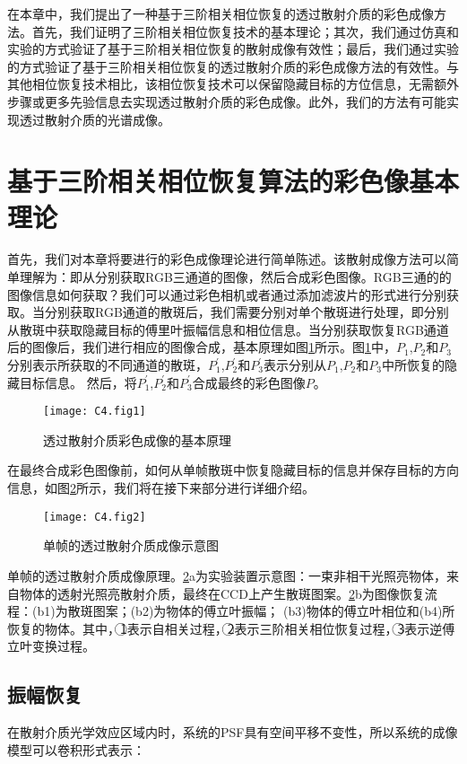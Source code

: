 在本章中，我们提出了一种基于三阶相关相位恢复的透过散射介质的彩色成像方法。首先，我们证明了三阶相关相位恢复技术的基本理论；其次，我们通过仿真和实验的方式验证了基于三阶相关相位恢复的散射成像有效性；最后，我们通过实验的方式验证了基于三阶相关相位恢复的透过散射介质的彩色成像方法的有效性。与其他相位恢复技术相比，该相位恢复技术可以保留隐藏目标的方位信息，无需额外步骤或更多先验信息去实现透过散射介质的彩色成像。此外，我们的方法有可能实现透过散射介质的光谱成像。

\section{基于三阶相关相位恢复算法的彩色像基本理论}

首先，我们对本章将要进行的彩色成像理论进行简单陈述。该散射成像方法可以简单理解为：即从分别获取RGB三通道的图像，然后合成彩色图像。RGB三通的的图像信息如何获取？我们可以通过彩色相机或者通过添加滤波片的形式进行分别获取。当分别获取RGB通道的散斑后，我们需要分别对单个散斑进行处理，即分别从散斑中获取隐藏目标的傅里叶振幅信息和相位信息。当分别获取恢复RGB通道后的图像后，我们进行相应的图像合成，基本原理如图\ref{fig:4.1}所示。图\ref{fig:4.1}中，$P_1$,$P_2$和$P_3$分别表示所获取的不同通道的散斑，$P_1^{\prime}$,$P_2^{\prime}$和$P_3^{\prime}$表示分别从$P_1$,$P_2$和$P_3$中所恢复的隐藏目标信息。
然后，将$P_1^{\prime}$,$P_2^{\prime}$和$P_3^{\prime}$合成最终的彩色图像$P$。

\begin{figure}[htp]
	\centering
	\texttt{[image: C4.fig1]}
	\caption{透过散射介质彩色成像的基本原理}
	\label{fig:4.1}
\end{figure}
在最终合成彩色图像前，如何从单帧散斑中恢复隐藏目标的信息并保存目标的方向信息，如图\ref{fig:4.2}所示，我们将在接下来部分进行详细介绍。
\begin{figure}[htp]
	\centering
	\texttt{[image: C4.fig2]}
	\caption{单帧的透过散射介质成像示意图}
	\label{fig:4.2}
\end{figure}
单帧的透过散射介质成像原理。\ref{fig:4.2}a为实验装置示意图：一束非相干光照亮物体，来自物体的透射光照亮散射介质，最终在CCD上产生散斑图案。\ref{fig:4.2}b为图像恢复流程：(b1)为散斑图案；(b2)为物体的傅立叶振幅； (b3)物体的傅立叶相位和(b4)所恢复的物体。其中，{\large \textcircled{\normalsize 1}}表示自相关过程，{\large \textcircled{\normalsize 2}}表示三阶相关相位恢复过程，{\large \textcircled{\normalsize 3}}表示逆傅立叶变换过程。

\subsection{振幅恢复}
在散射介质光学效应区域内时，系统的PSF具有空间平移不变性，所以系统的成像模型可以卷积形式表示：

